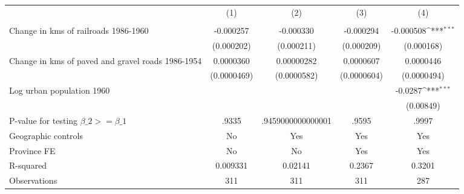 {
\def\sym#1{\ifmmode^{#1}\else\(^{#1}\)\fi}
\begin{tabular}{l*{4}{c}}
\hline\hline
                &\multicolumn{1}{c}{(1)}&\multicolumn{1}{c}{(2)}&\multicolumn{1}{c}{(3)}&\multicolumn{1}{c}{(4)}\\
                &\multicolumn{1}{c}{}&\multicolumn{1}{c}{}&\multicolumn{1}{c}{}&\multicolumn{1}{c}{}\\
\hline
Change in kms of railroads 1986-1960&-0.000257         &-0.000330         &-0.000294         &-0.000508\sym{***}\\
                &(0.000202)         &(0.000211)         &(0.000209)         &(0.000168)         \\
[1em]
Change in kms of paved and gravel roads 1986-1954&0.0000360         &0.00000282         &0.0000607         &0.0000446         \\
                &(0.0000469)         &(0.0000582)         &(0.0000604)         &(0.0000494)         \\
[1em]
Log urban population 1960&                  &                  &                  &  -0.0287\sym{***}\\
                &                  &                  &                  &(0.00849)         \\
\hline
P-value for testing $\beta\_{2} >= \beta\_{1}$&    .9335         &.9459000000000001         &    .9595         &    .9997         \\
Geographic controls&       No         &      Yes         &      Yes         &      Yes         \\
Province FE     &       No         &       No         &      Yes         &      Yes         \\
R-squared       & 0.009331         &  0.02141         &   0.2367         &   0.3201         \\
Observations    &      311         &      311         &      311         &      287         \\
\hline\hline
\end{tabular}
}
